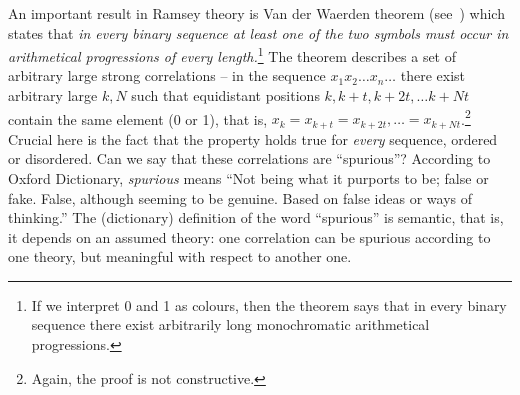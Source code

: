 \documentclass[12pt]{article}
\begin{document}
An important result in Ramsey theory is Van der Waerden theorem (see~\cite{graham}) which states that {\em in every
binary sequence at least one of
the two symbols must occur in arithmetical progressions of every
length.}\footnote{If we interpret 0 and 1 as colours,
then the theorem says that in every binary sequence there exist arbitrarily long monochromatic arithmetical
progressions.} The theorem describes a set of arbitrary large strong correlations -- in the sequence $x_1x_2\dots
x_n\dots$ there exist arbitrary large $k, N$ such that equidistant positions $k, k+t, k+2t, \dots k+Nt$ contain the same
element (0 or 1), that is, $x_k = x_{k+t}= x_{k+2t}, \dots =x_{k+Nt}$.\footnote{Again,
the proof is not constructive.} Crucial here is the fact that the property holds true for {\em every} sequence, ordered or
disordered.
Can we say that these correlations are ``spurious''?
According to Oxford Dictionary, {\it spurious} means ``Not being what it purports to be; false or fake. False, although
seeming to be genuine. Based on false ideas or ways of thinking.'' The (dictionary) definition of the word ``spurious'' is
semantic, that is, it depends on an assumed theory: one correlation can be spurious according to one theory, but
meaningful with respect to another one.
\end{document}
